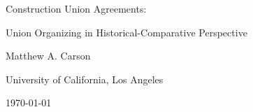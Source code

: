 \renewenvironment{quote}
  {\list{}{\leftmargin=\parindent\rightmargin=0pt}%
   \item\relax}
  {\endlist}

\renewenvironment{abstract}
  {\par\noindent\centering\textbf{Abstract}\par\noindent\raggedright}
  {\par}

\renewenvironment{quote}
  {\begin{singlespace}\list{}{\leftmargin=\parindent\rightmargin=0pt}%
   \item\relax}
  {\endlist\end{singlespace}}



\begin{titlepage}
  \thispagestyle{fancy}
  \centering
  \vspace*{1.95in}
  {\LARGE Construction Union Agreements:\par Union Organizing in Historical-Comparative Perspective\par}
  \vspace{1.2in}
  {Matthew A. Carson\par}
  \vspace{0in}
  {University of California, Los Angeles\par}
  \vspace{0.5in}
  {\today\par}
\end{titlepage}


